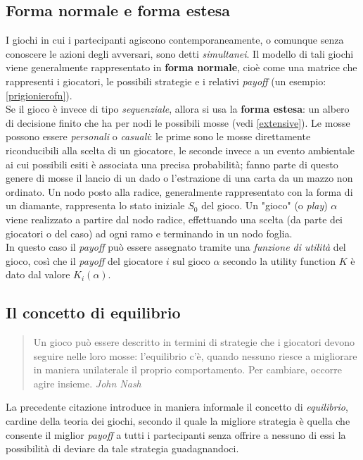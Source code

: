 \subsection{Forma normale e forma estesa}
I giochi in cui i partecipanti agiscono contemporaneamente, o comunque senza conoscere le azioni degli avversari, sono detti \emph{simultanei}.
Il modello di tali giochi viene generalmente rappresentato in \textbf{forma normale}, cioè come una matrice che rappresenti i giocatori, le possibili strategie e i relativi \emph{payoff} (un esempio: \ref{prigionierofn}).\\
Se il gioco è invece di tipo \emph{sequenziale}, allora si usa la \textbf{forma estesa}: un albero di decisione finito che ha per nodi le possibili mosse (vedi \ref{extensive}).
Le mosse possono essere \emph{personali} o \emph{casuali}: le prime sono le mosse direttamente riconducibili alla scelta di un giocatore, le seconde invece a un evento ambientale ai cui possibili esiti è associata una precisa probabilità; fanno parte di questo genere di mosse il lancio di un dado o l'estrazione di una carta da un mazzo non ordinato.
Un nodo posto alla radice, generalmente rappresentato con la forma di un diamante, rappresenta lo stato iniziale $S_0$ del gioco.
Un "gioco" (o \emph{play}) $\alpha$ viene realizzato a partire dal nodo radice, effettuando una scelta (da parte dei giocatori o del caso) ad ogni ramo e terminando in un nodo foglia.\\
In questo caso il \emph{payoff} può essere assegnato tramite una \emph{funzione di utilità} del gioco, così che il \emph{payoff} del giocatore $i$ sul gioco $\alpha$ secondo la utility function $K$ è dato dal valore $K_i(\alpha)$. \cite{frank}

\subsection{Il concetto di equilibrio}

\begin{quote}
Un gioco può essere descritto in termini di strategie che i giocatori devono seguire nelle loro mosse: l'equilibrio c'è, quando nessuno riesce a migliorare in maniera unilaterale il proprio comportamento. Per cambiare, occorre agire insieme. \emph{John Nash}
\end{quote}
La precedente citazione introduce in maniera informale il concetto di \emph{equilibrio}, cardine della teoria dei giochi, secondo il quale la migliore strategia è quella che consente il miglior \emph{payoff} a tutti i partecipanti senza offrire a nessuno di essi la possibilità di deviare da tale strategia guadagnandoci.\\

